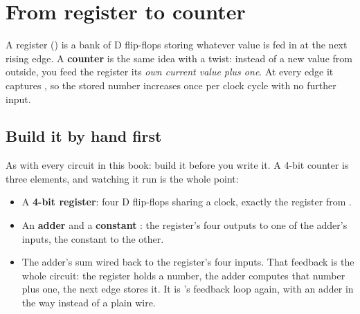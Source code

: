 
\section{From register to counter}
\label{c6:sec:counter}

A register () is a bank of D flip-flops storing whatever value is fed in at the next
rising edge. A \textbf{counter} is the same idea with a twist: instead of a new value from outside,
you feed the register its \emph{own current value plus one}. At every edge it captures
, so the stored number increases once per clock cycle with no further
input.

\subsection*{Build it by hand first}
As with every circuit in this book: build it before you write it. A 4-bit counter is three
elements, and watching it run is the whole point:
\begin{itemize}
  \item A \textbf{4-bit register}: four D flip-flops sharing a clock, exactly the register from
    .
  \item An \textbf{adder} and a \textbf{constant }: the register's four outputs to one of
    the adder's inputs, the constant to the other.
  \item The adder's sum wired back to the register's four  inputs. That feedback is the
    whole circuit: the register holds a number, the adder computes that number plus one, the next
    edge stores it. It is 's feedback loop again, with an adder in the way
    instead of a plain wire.
\end{itemize}


